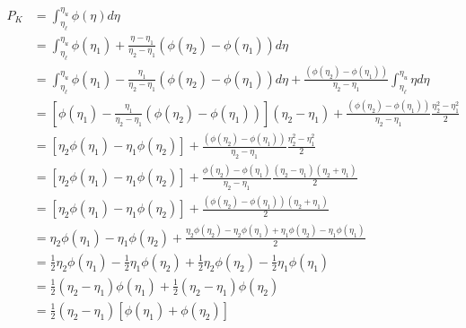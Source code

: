 \documentclass{article}
\begin{document}
\begin{solution}
\begin{align*}
P_{K} & =\int_{\eta_{\ell}}^{\eta_{u}}\phi(\eta)d\eta\\
 & =\int_{\eta_{\ell}}^{\eta_{u}}\phi\left(\eta_{1}\right)+\frac{\eta-\eta_{1}}{\eta_{2}-\eta_{1}}\left(\phi\left(\eta_{2}\right)-\phi\left(\eta_{1}\right)\right)d\eta\\
 & =\int_{\eta_{\ell}}^{\eta_{u}}\phi\left(\eta_{1}\right)-\frac{\eta_{1}}{\eta_{2}-\eta_{1}}\left(\phi\left(\eta_{2}\right)-\phi\left(\eta_{1}\right)\right)d\eta+\frac{\left(\phi\left(\eta_{2}\right)-\phi\left(\eta_{1}\right)\right)}{\eta_{2}-\eta_{1}}\int_{\eta_{\ell}}^{\eta_{u}}\eta d\eta\\
 & =\left[\phi\left(\eta_{1}\right)-\frac{\eta_{1}}{\eta_{2}-\eta_{1}}\left(\phi\left(\eta_{2}\right)-\phi\left(\eta_{1}\right)\right)\right]\left(\eta_{2}-\eta_{1}\right)+\frac{\left(\phi\left(\eta_{2}\right)-\phi\left(\eta_{1}\right)\right)}{\eta_{2}-\eta_{1}}\frac{\eta_{2}^{2}-\eta_{1}^{2}}{2}\\
 & =\left[\eta_{2}\phi\left(\eta_{1}\right)-\eta_{1}\phi\left(\eta_{2}\right)\right]+\frac{\left(\phi\left(\eta_{2}\right)-\phi\left(\eta_{1}\right)\right)}{\eta_{2}-\eta_{1}}\frac{\eta_{2}^{2}-\eta_{1}^{2}}{2}\\
 & =\left[\eta_{2}\phi\left(\eta_{1}\right)-\eta_{1}\phi\left(\eta_{2}\right)\right]+\frac{\phi\left(\eta_{2}\right)-\phi\left(\eta_{1}\right)}{\eta_{2}-\eta_{1}}\frac{\left(\eta_{2}-\eta_{1}\right)\left(\eta_{2}+\eta_{1}\right)}{2}\\
 & =\left[\eta_{2}\phi\left(\eta_{1}\right)-\eta_{1}\phi\left(\eta_{2}\right)\right]+\frac{\left(\phi\left(\eta_{2}\right)-\phi\left(\eta_{1}\right)\right)\left(\eta_{2}+\eta_{1}\right)}{2}\\
 & =\eta_{2}\phi\left(\eta_{1}\right)-\eta_{1}\phi\left(\eta_{2}\right)+\frac{\eta_{2}\phi\left(\eta_{2}\right)-\eta_{2}\phi\left(\eta_{1}\right)+\eta_{1}\phi\left(\eta_{2}\right)-\eta_{1}\phi\left(\eta_{1}\right)}{2}\\
 & =\frac{1}{2}\eta_{2}\phi\left(\eta_{1}\right)-\frac{1}{2}\eta_{1}\phi\left(\eta_{2}\right)+\frac{1}{2}\eta_{2}\phi\left(\eta_{2}\right)-\frac{1}{2}\eta_{1}\phi\left(\eta_{1}\right)\\
 & =\frac{1}{2}\left(\eta_{2}-\eta_{1}\right)\phi\left(\eta_{1}\right)+\frac{1}{2}\left(\eta_{2}-\eta_{1}\right)\phi\left(\eta_{2}\right)\\
 & =\frac{1}{2}\left(\eta_{2}-\eta_{1}\right)\left[\phi\left(\eta_{1}\right)+\phi\left(\eta_{2}\right)\right]
\end{align*}



\end{solution}
\end{document}
